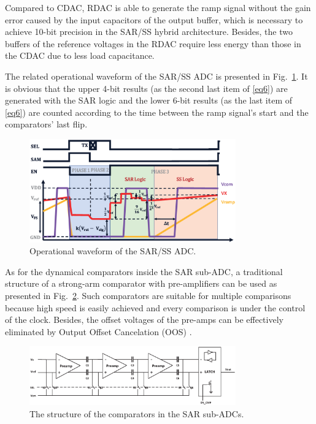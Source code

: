 Compared to CDAC, RDAC is able to generate the ramp signal without the gain error caused by the input capacitors of the output buffer, 
which is necessary to achieve 10-bit precision in the SAR/SS hybrid architecture.
Besides, the two buffers of the reference voltages in the RDAC require less energy than those in the CDAC due to less load capacitance.  

The related operational waveform of the SAR/SS ADC is presented in Fig.~\ref{SARWAVE}. It is obvious that the upper 4-bit results (as the second last item of \eqref{eq6}) are generated 
with the SAR logic and the lower 6-bit results (as the last item of \eqref{eq6}) are counted according to the time between the ramp signal’s start and the comparators’ last flip. 

\begin{figure}[htbp]
	\centerline{\includegraphics[width=3.5in]{./Figures/SARWAVE.eps}}
	\caption{Operational waveform of the SAR/SS ADC.}
	\label{SARWAVE}
\end{figure} 

As for the dynamical comparators inside the SAR sub-ADC, a traditional structure of a strong-arm comparator with pre-amplifiers can be used as presented in Fig.~\ref{LATCH}. Such comparators 
are suitable for multiple comparisons because high speed is easily achieved and every comparison is under the control of the clock. Besides, the offset voltages of the pre-amps can be effectively eliminated by Output Offset Cancelation (OOS) \cite{razavi_design_1992}.

\begin{figure}[htbp]
	\centerline{\includegraphics[width=3.5in]{./Figures/LATCH.eps}}
	\caption{The structure of the comparators in the SAR sub-ADCs.}
	\label{LATCH}
\end{figure} 

